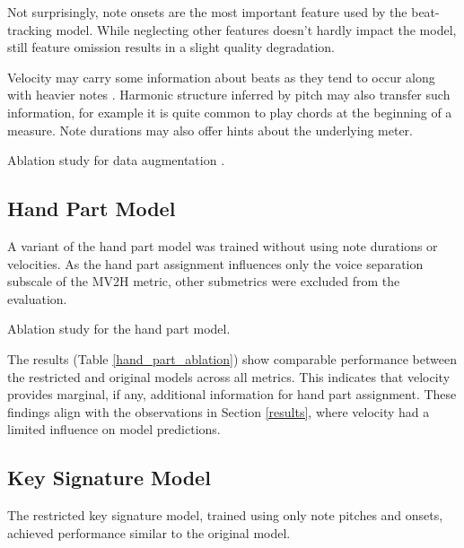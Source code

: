 Not surprisingly, note onsets are the most important feature used by the beat-tracking model. While neglecting other features doesn't hardly impact the model, still feature omission results in a slight quality degradation.

Velocity may carry some information about beats as they tend to occur along with heavier notes \cite{Liu2022}. Harmonic structure inferred by pitch may also transfer such information, for example it is quite common to play chords at the beginning of a measure. Note durations may also offer hints about the underlying meter.

\begin{table}[ht!]
\centering

\caption[Ablation study for data augmentation.]{Ablation study for data augmentation \cite{Liu2022}.}
\label{beat_tracking_data_augmentation}
\end{table}

\subsection{Hand Part Model}

A variant of the hand part model was trained without using note durations or velocities. As the hand part assignment influences only the voice separation subscale of the MV2H metric, other submetrics were excluded from the evaluation.

\begin{table}[ht!]
\centering

\caption[Ablation study for the hand part model.]{Ablation study for the hand part model.}
\label{hand_part_ablation}
\end{table}

The results (Table \ref{hand_part_ablation}) show comparable performance between the restricted and original models across all metrics. This indicates that velocity provides marginal, if any, additional information for hand part assignment. These findings align with the observations in Section \ref{results}, where velocity had a limited influence on model predictions.

\subsection{Key Signature Model}

The restricted key signature model, trained using only note pitches and onsets, achieved performance similar to the original model.

